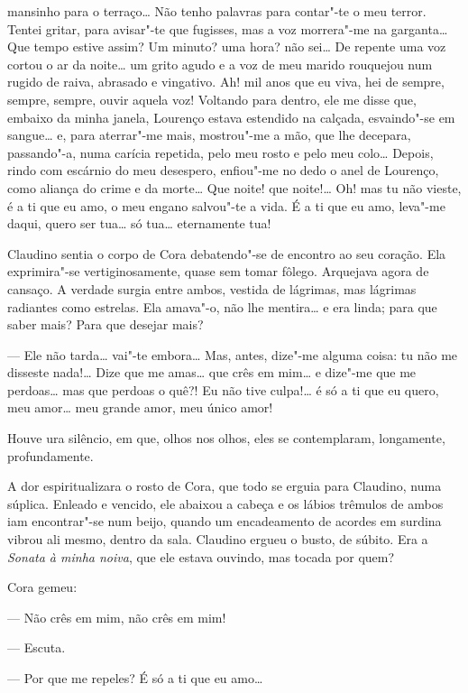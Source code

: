 mansinho para o terraço\ldots{} Não tenho palavras para contar"-te o meu
terror. Tentei gritar, para avisar"-te que fugisses, mas a voz morrera"-me
na garganta\ldots{} Que tempo estive assim? Um minuto? uma hora? não sei\ldots{}
De repente uma voz cortou o ar da noite\ldots{} um grito agudo e a voz de meu
marido rouquejou num rugido de raiva, abrasado e vingativo. Ah! mil anos
que eu viva, hei de sempre, sempre, sempre, ouvir aquela voz! Voltando
para dentro, ele me disse que, embaixo da minha janela, Lourenço estava
estendido na calçada, esvaindo"-se em sangue\ldots{} e, para aterrar"-me mais,
mostrou"-me a mão, que lhe decepara, passando"-a, numa carícia repetida,
pelo meu rosto e pelo meu colo\ldots{} Depois, rindo com escárnio do meu
desespero, enfiou"-me no dedo o anel de Lourenço, como aliança do crime e
da morte\ldots{} Que noite! que noite!\ldots{} Oh! mas tu não vieste, é a ti que
eu amo, o meu engano salvou"-te a vida. É a ti que eu amo, leva"-me daqui,
quero ser tua\ldots{} só tua\ldots{} eternamente tua!

Claudino sentia o corpo de Cora debatendo"-se de encontro ao seu coração.
Ela exprimira"-se vertiginosamente, quase sem tomar fôlego. Arquejava
agora de cansaço. A verdade surgia entre ambos, vestida de lágrimas, mas
lágrimas radiantes como estrelas. Ela amava"-o, não lhe mentira\ldots{} e era
linda; para que saber mais? Para que desejar mais?

--- Ele não tarda\ldots{} vai"-te embora\ldots{} Mas, antes, dize"-me alguma coisa:
tu não me disseste nada!\ldots{} Dize que me amas\ldots{} que crês em mim\ldots{} e
dize"-me que me perdoas\ldots{} mas que perdoas o quê?! Eu não tive culpa!\ldots{}
é só a ti que eu quero, meu amor\ldots{} meu grande amor, meu único amor!

Houve ura silêncio, em que, olhos nos olhos, eles se contemplaram,
longamente, profundamente.

A dor espiritualizara o rosto de Cora, que todo se erguia para Claudino,
numa súplica. Enleado e vencido, ele abaixou a cabeça e os lábios
trêmulos de ambos iam encontrar"-se num beijo, quando um encadeamento de
acordes em surdina vibrou ali mesmo, dentro da sala. Claudino ergueu o
busto, de súbito. Era a \emph{Sonata à minha noiva}, que ele estava
ouvindo, mas tocada por quem?

Cora gemeu:

--- Não crês em mim, não crês em mim!

--- Escuta.

--- Por que me repeles? É só a ti que eu amo\ldots{}

